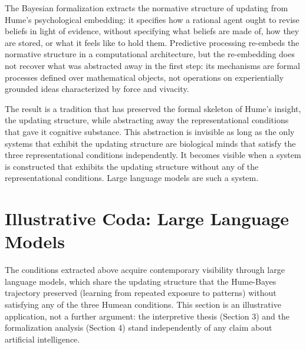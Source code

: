 \documentclass[11pt]{article}
\begin{document}
The Bayesian formalization extracts the normative structure of updating from Hume's psychological embedding: it specifies how a rational agent ought to revise beliefs in light of evidence, without specifying what beliefs are made of, how they are stored, or what it feels like to hold them. Predictive processing re-embeds the normative structure in a computational architecture, but the re-embedding does not recover what was abstracted away in the first step: its mechanisms are formal processes defined over mathematical objects, not operations on experientially grounded ideas characterized by force and vivacity.

The result is a tradition that has preserved the formal skeleton of Hume's insight, the updating structure, while abstracting away the representational conditions that gave it cognitive substance. This abstraction is invisible as long as the only systems that exhibit the updating structure are biological minds that satisfy the three representational conditions independently. It becomes visible when a system is constructed that exhibits the updating structure without any of the representational conditions. Large language models are such a system.

\section{Illustrative Coda: Large Language Models}

The conditions extracted above acquire contemporary visibility through large language models, which share the updating structure that the Hume-Bayes trajectory preserved (learning from repeated exposure to patterns) without satisfying any of the three Humean conditions. This section is an illustrative application, not a further argument: the interpretive thesis (Section 3) and the formalization analysis (Section 4) stand independently of any claim about artificial intelligence.
\end{document}
